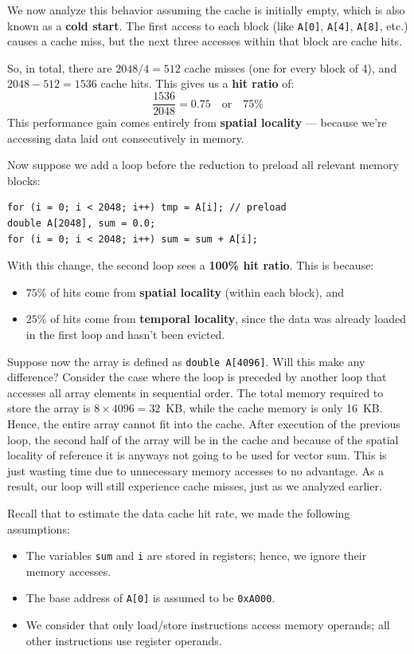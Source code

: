 \documentclass[12pt]{book}
\begin{document}
We now analyze this behavior assuming the cache is initially empty, which is also known as a \textbf{cold start}. The first access to each block (like \texttt{A[0]}, \texttt{A[4]}, \texttt{A[8]}, etc.) causes a cache miss, but the next three accesses within that block are cache hits. 

So, in total, there are $2048 / 4 = 512$ cache misses (one for every block of 4), and $2048 - 512 = 1536$ cache hits. This gives us a \textbf{hit ratio} of:
\[
\frac{1536}{2048} = 0.75 \quad \text{or} \quad 75\%
\]
This performance gain comes entirely from \textbf{spatial locality} — because we're accessing data laid out consecutively in memory.

Now suppose we add a loop before the reduction to preload all relevant memory blocks:
\begin{lstlisting}[style=cppstyle, caption={Preloading the Array for Temporal Locality}]
for (i = 0; i < 2048; i++) tmp = A[i]; // preload
double A[2048], sum = 0.0;
for (i = 0; i < 2048; i++) sum = sum + A[i];
\end{lstlisting}

With this change, the second loop sees a \textbf{100\% hit ratio}. This is because:
\begin{itemize}
    \item $75\%$ of hits come from \textbf{spatial locality} (within each block), and
    \item $25\%$ of hits come from \textbf{temporal locality}, since the data was already loaded in the first loop and hasn't been evicted.
\end{itemize}

Suppose now the array is defined as \texttt{double A[4096]}. Will this make any difference? Consider the case where the loop is preceded by another loop that accesses all array elements in sequential order. The total memory required to store the array is $8 \times 4096 = 32$~KB, while the cache memory is only 16~KB. Hence, the entire array cannot fit into the cache. After execution of the previous loop, the second half of the array will be in the cache and because of the spatial locality of reference it is anyways not going to be used for vector sum. This is just wasting time due to unnecessary memory accesses to no advantage. As a result, our loop will still experience cache misses, just as we analyzed earlier.

Recall that to estimate the data cache hit rate, we made the following assumptions:
\begin{itemize}
    \item The variables \texttt{sum} and \texttt{i} are stored in registers; hence, we ignore their memory accesses.
    \item The base address of \texttt{A[0]} is assumed to be \texttt{0xA000}.
    \item We consider that only load/store instructions access memory operands; all other instructions use register operands.
\end{itemize}
\end{document}
